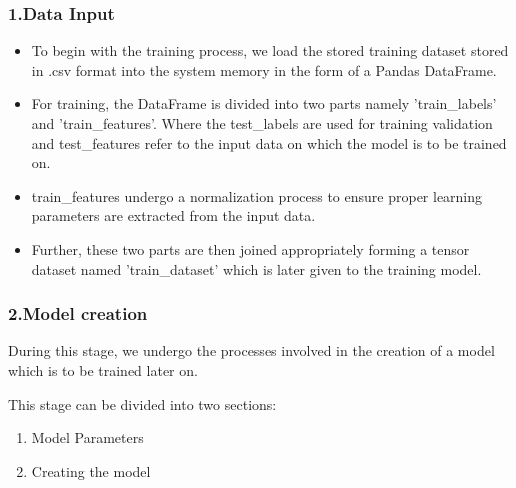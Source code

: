 \subsubsection*{1.Data Input}
\begin{itemize}
  \item   To begin with the training process, we load the stored training dataset stored in .csv format into the system memory in the form of a Pandas DataFrame.
  \item For training, the DataFrame is divided into two parts namely 'train\_labels' and 'train\_features'. Where the test\_labels are used for training validation and test\_features refer to the input data on which the model is to be trained on.
  \item train\_features undergo a normalization process to ensure proper learning parameters are extracted from the input data.
  \item Further, these two parts are then joined appropriately forming a tensor dataset named 'train\_dataset' which is later given to the training model.
\end{itemize}

\subsubsection*{2.Model creation}
During this stage, we undergo the processes involved in the creation of a model which is to be trained later on.

\noindent This stage can be divided into two sections:
\begin{enumerate}
  \item Model Parameters
  \item Creating the model
\end{enumerate}

